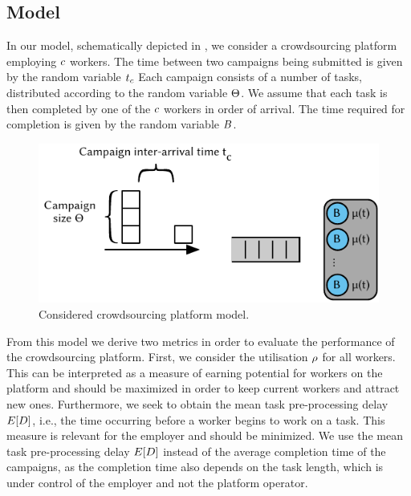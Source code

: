 \subsection{Model}\label{sec:cloud:crowdsourcing:model}

In our model, schematically depicted in , we consider a crowdsourcing  platform employing \(c\) workers.
The time between two campaigns being submitted is given by the random variable \(t_c\)
Each campaign consists of a number of tasks, distributed according to the random variable \(\Theta\).
We assume that each task is then completed by one of the \(c\) workers in order of arrival.
The time required for completion is given by the random variable \(B\).

\begin{figure}
  \centering
  \includegraphics{cloud/crowdsourcing/model/figures/model}
  \caption{Considered crowdsourcing platform model.}
  \label{fig:sec:cloud:crowdsourcing:model:model}
\end{figure}

From this model we derive two metrics in order to evaluate the performance of the crowdsourcing platform.
First, we consider the utilisation \(\rho\) for all workers.
This can be interpreted as a measure of earning potential for workers on the platform and should be maximized in order to keep current workers and attract new ones. 
Furthermore, we seek to obtain the mean task pre-processing delay \(E[D]\), i.e., the time occurring before a worker begins to work on a task.
This measure is relevant for the employer and should be minimized.
We use the mean task pre-processing delay \(E[D]\) instead of the average completion time of the campaigns, as the completion time also depends on the task length, which is under control of the employer and not the platform operator.

